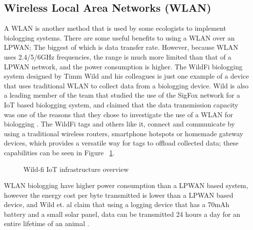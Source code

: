\documentclass[sigplan,screen,nonacm]{acmart}
\begin{document}
\subsection{Wireless Local Area Networks (WLAN)}
\label{subsec:Wireless Local Area Networks (WLAN)}

A WLAN is another method that is used by some ecologists to 
implement biologging systems. There are some useful benefits to using a WLAN over an LPWAN; The biggest of which is data 
transfer rate. However, because WLAN uses 2.4/5/6GHz frequencies, the range is much more limited 
than that of a LPWAN network, and the power consumption is higher. The WildFi biologging system designed by 
Timm Wild and his colleagues is just one example of a device that uses traditional 
WLAN to collect data from a biologging device. Wild is also a leading member of the 
team that studied the use of the SigFox network for a IoT based biologging system, and 
claimed that the data transmission capacity was one of the reasons that they chose to 
investigate the use of a WLAN for biologging \cite{wild2023internet}. 
The WildFi tags and others like it, connect and communicate by using a traditional wireless 
routers, smartphone hotspots or homemade gateway devices, which provides a versatile way for tags to offload collected data; 
these capabilities can be seen in Figure ~\ref{fig:wild-fi_IoT_diagram}.
\begin{figure}[htbp]
  \centering
  \caption{Wild-fi IoT infrastructure overview \cite{wild2023internet}}
  \label{fig:wild-fi_IoT_diagram}
\end{figure}
WLAN biologging have higher power consumption than a LPWAN based system, however the energy cost per byte 
transmitted is lower than a LPWAN based device, and Wild et. al claim that using a logging device that has a 
70mAh battery and a small solar panel, data can be transmitted 24 hours a day for an entire lifetime of an animal \cite{wild2023internet}.
\end{document}
